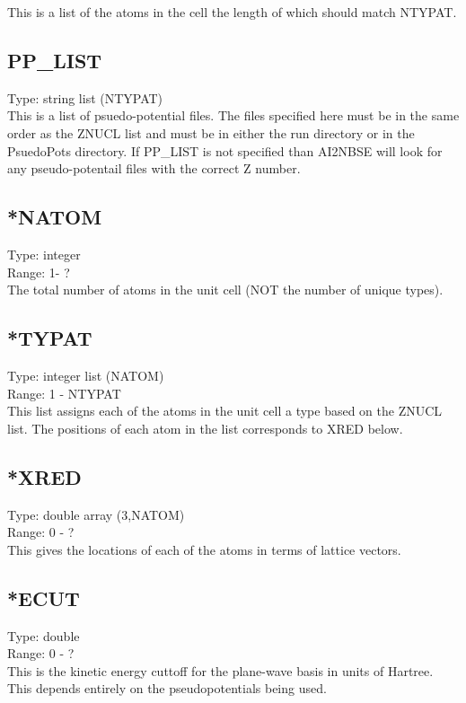 \documentclass[12pt]{article}
\begin{document}
This is a list of the atoms in the cell the length of which should match NTYPAT. 
\subsection{PP\_LIST}
Type: string list (NTYPAT) \\

This is a list of psuedo-potential files. The files specified here must be in the same order as the ZNUCL list and must be in either the run directory or in the PsuedoPots directory. If PP\_LIST is not specified than \textsc{AI2NBSE} will look for any pseudo-potentail files with the correct Z number.


\subsection{*NATOM}
Type: integer \\
Range: 1- ? \\

The total number of atoms in the unit cell (NOT the number of unique types).

\subsection{*TYPAT}
Type: integer list (NATOM) \\
Range: 1 - NTYPAT \\

This list assigns each of the atoms in the unit cell a type based on the ZNUCL list. The positions of each atom in the list corresponds to XRED below.

\subsection{*XRED}
Type: double array (3,NATOM) \\
Range: 0 - ? \\

This gives the locations of each of the atoms in terms of lattice vectors.

\subsection{*ECUT}
Type: double \\
Range: 0 - ? \\

This is the kinetic energy cuttoff for the plane-wave basis in units of Hartree. This depends entirely on
the pseudopotentials being used.
\end{document}

